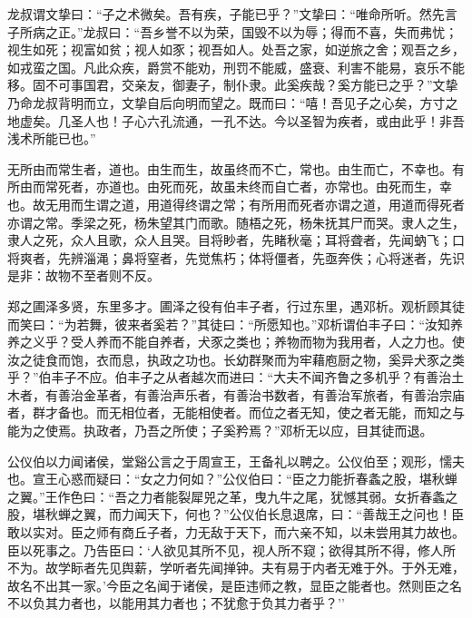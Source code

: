 \documentclass[]{article}
\begin{document}
龙叔谓文挚曰：``子之术微矣。吾有疾，子能已乎？''文挚曰：``唯命所听。然先言子所病之正。''龙叔曰：``吾乡誉不以为荣，国毁不以为辱；得而不喜，失而弗忧；视生如死；视富如贫；视人如豕；视吾如人。处吾之家，如逆旅之舍；观吾之乡，如戎蛮之国。凡此众疾，爵赏不能劝，刑罚不能威，盛衰、利害不能易，哀乐不能移。固不可事国君，交亲友，御妻子，制仆隶。此奚疾哉？奚方能已之乎？''文挚乃命龙叔背明而立，文挚自后向明而望之。既而曰：``嘻！吾见子之心矣，方寸之地虚矣。几圣人也！子心六孔流通，一孔不达。今以圣智为疾者，或由此乎！非吾浅术所能已也。''

无所由而常生者，道也。由生而生，故虽终而不亡，常也。由生而亡，不幸也。有所由而常死者，亦道也。由死而死，故虽未终而自亡者，亦常也。由死而生，幸也。故无用而生谓之道，用道得终谓之常；有所用而死者亦谓之道，用道而得死者亦谓之常。季梁之死，杨朱望其门而歌。随梧之死，杨朱抚其尸而哭。隶人之生，隶人之死，众人且歌，众人且哭。目将眇者，先睹秋毫；耳将聋者，先闻蚋飞；口将爽者，先辨淄渑；鼻将窒者，先觉焦朽；体将僵者，先亟奔佚；心将迷者，先识是非：故物不至者则不反。

郑之圃泽多贤，东里多才。圃泽之役有伯丰子者，行过东里，遇邓析。观析顾其徒而笑曰：``为若舞，彼来者奚若？''其徒曰：``所愿知也。''邓析谓伯丰子曰：``汝知养养之义乎？受人养而不能自养者，犬豕之类也；养物而物为我用者，人之力也。使汝之徒食而饱，衣而息，执政之功也。长幼群聚而为牢藉庖厨之物，奚异犬豕之类乎？''伯丰子不应。伯丰子之从者越次而进曰：``大夫不闻齐鲁之多机乎？有善治土木者，有善治金革者，有善治声乐者，有善治书数者，有善治军旅者，有善治宗庙者，群才备也。而无相位者，无能相使者。而位之者无知，使之者无能，而知之与能为之使焉。执政者，乃吾之所使；子奚矜焉？''邓析无以应，目其徒而退。

公仪伯以力闻诸侯，堂谿公言之于周宣王，王备礼以聘之。公仪伯至；观形，懦夫也。宣王心惑而疑曰：``女之力何如？''公仪伯曰：``臣之力能折春螽之股，堪秋蝉之翼。''王作色曰：``吾之力者能裂犀兕之革，曳九牛之尾，犹憾其弱。女折春螽之股，堪秋蝉之翼，而力闻天下，何也？''公仪伯长息退席，曰：``善哉王之问也！臣敢以实对。臣之师有商丘子者，力无敌于天下，而六亲不知，以未尝用其力故也。臣以死事之。乃告臣曰：`人欲见其所不见，视人所不窥；欲得其所不得，修人所不为。故学眎者先见舆薪，学听者先闻掸钟。夫有易于内者无难于外。于外无难，故名不出其一家。'今臣之名闻于诸侯，是臣违师之教，显臣之能者也。然则臣之名不以负其力者也，以能用其力者也；不犹愈于负其力者乎？''
\end{document}

